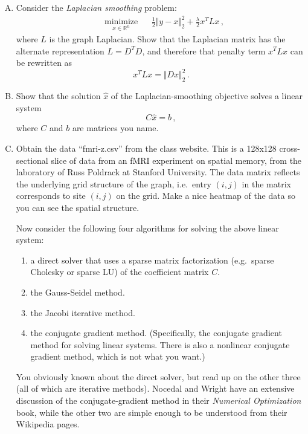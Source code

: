 \documentclass{mynotes}
\newcommand{\R}{\mathbb{R}}
\begin{document}
\begin{enumerate}[(A)]
\item Consider the \emph{Laplacian smoothing} problem:
\begin{equation}
\begin{aligned}
& \underset{x \in \R^n}{\text{minimize}}
& & 
\frac{1}{2} \Vert y - x \Vert_2^2  + \frac{\lambda}{2} x^T L x \, ,
\end{aligned}
\end{equation}
where $L$ is the graph Laplacian.  Show that the Laplacian matrix has the alternate representation $L = D^T D$, and therefore that penalty term $x^T L x$ can be rewritten as
$$
x^T L x = \Vert D x \Vert_2^2 \, .
$$

\item Show that the solution $\hat{x}$ of the Laplacian-smoothing objective solves a linear system
$$
C \hat{x} = b \, ,
$$
where $C$ and $b$ are matrices you name.

\item Obtain the data ``fmri-z.csv'' from the class website.  This is a 128x128 cross-sectional slice of data from an fMRI experiment on spatial memory, from the laboratory of Russ Poldrack at Stanford University.  The data matrix reflects the underlying grid structure of the graph, i.e.~entry $(i,j)$ in the matrix corresponds to site $(i,j)$ on the grid.  Make a nice heatmap of the data so you can see the spatial structure.

Now consider the following four algorithms for solving the above linear system:
\begin{enumerate}[1.]
\item a direct solver that uses a sparse matrix factorization (e.g.~sparse Cholesky or sparse LU) of the coefficient matrix $C$.
\item the Gauss-Seidel method.
\item the Jacobi iterative method.
\item the conjugate gradient method.  (Specifically, the conjugate gradient method for solving linear systems.  There is also a nonlinear conjugate gradient method, which is not what you want.)
\end{enumerate}

You obviously known about the direct solver, but read up on the other three (all of which are iterative methods).  Nocedal and Wright have an extensive discussion of the conjugate-gradient method in their \textit{Numerical Optimization} book, while the other two are simple enough to be understood from their Wikipedia pages.


\end{enumerate}
\end{document}
